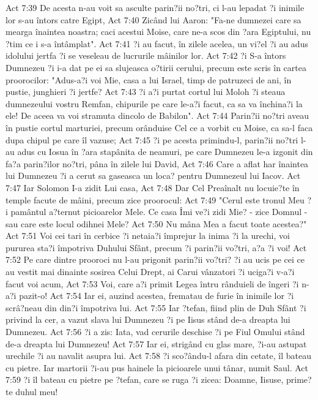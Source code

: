 Act 7:39  De acesta n-au voit sa asculte parin?ii no?tri, ci l-au lepadat ?i inimile lor s-au întors catre Egipt,
Act 7:40  Zicând lui Aaron: "Fa-ne dumnezei care sa mearga înaintea noastra; caci acestui Moise, care ne-a scos din ?ara Egiptului, nu ?tim ce i s-a întâmplat".
Act 7:41  ?i au facut, în zilele acelea, un vi?el ?i au adus idolului jertfa ?i se veseleau de lucrurile mâinilor lor.
Act 7:42  ?i S-a întors Dumnezeu ?i i-a dat pe ei sa slujeasca o?tirii cerului, precum este scris în cartea proorocilor: "Adus-a?i voi Mie, casa a lui Israel, timp de patruzeci de ani, în pustie, junghieri ?i jertfe?
Act 7:43  ?i a?i purtat cortul lui Moloh ?i steaua dumnezeului vostru Remfan, chipurile pe care le-a?i facut, ca sa va închina?i la ele! De aceea va voi stramuta dincolo de Babilon".
Act 7:44  Parin?ii no?tri aveau în pustie cortul marturiei, precum orânduise Cel ce a vorbit cu Moise, ca sa-l faca dupa chipul pe care îl vazuse;
Act 7:45  ?i pe acesta primindu-l, parin?ii no?tri l-au adus cu Iosua în ?ara stapânita de neamuri, pe care Dumnezeu le-a izgonit din fa?a parin?ilor no?tri, pâna în zilele lui David,
Act 7:46  Care a aflat har înaintea lui Dumnezeu ?i a cerut sa gaseasca un loca? pentru Dumnezeul lui Iacov.
Act 7:47  Iar Solomon I-a zidit Lui casa,
Act 7:48  Dar Cel Preaînalt nu locuie?te în temple facute de mâini, precum zice proorocul:
Act 7:49  "Cerul este tronul Meu ?i pamântul a?ternut picioarelor Mele. Ce casa Îmi ve?i zidi Mie? - zice Domnul - sau care este locul odihnei Mele?
Act 7:50  Nu mâna Mea a facut toate acestea?"
Act 7:51  Voi cei tari în cerbice ?i netaia?i împrejur la inima ?i la urechi, voi pururea sta?i împotriva Duhului Sfânt, precum ?i parin?ii vo?tri, a?a ?i voi!
Act 7:52  Pe care dintre prooroci nu l-au prigonit parin?ii vo?tri? ?i au ucis pe cei ce au vestit mai dinainte sosirea Celui Drept, ai Carui vânzatori ?i uciga?i v-a?i facut voi acum,
Act 7:53  Voi, care a?i primit Legea întru rânduieli de îngeri ?i n-a?i pazit-o!
Act 7:54  Iar ei, auzind acestea, frematau de furie în inimile lor ?i scrâ?neau din din?i împotriva lui.
Act 7:55  Iar ?tefan, fiind plin de Duh Sfânt ?i privind la cer, a vazut slava lui Dumnezeu ?i pe Iisus stând de-a dreapta lui Dumnezeu.
Act 7:56  ?i a zis: Iata, vad cerurile deschise ?i pe Fiul Omului stând de-a dreapta lui Dumnezeu!
Act 7:57  Iar ei, strigând cu glas mare, ?i-au astupat urechile ?i au navalit asupra lui.
Act 7:58  ?i sco?ându-l afara din cetate, îl bateau cu pietre. Iar martorii ?i-au pus hainele la picioarele unui tânar, numit Saul.
Act 7:59  ?i îl bateau cu pietre pe ?tefan, care se ruga ?i zicea: Doamne, Iisuse, prime?te duhul meu!
